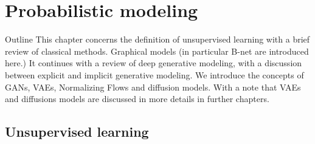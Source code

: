 \chapter{Probabilistic modeling}\label{ch:02}

\begin{remark}{Outline}
This chapter concerns the definition of unsupervised learning with a brief review of classical methods.
Graphical models (in particular B-net are introduced here.)
It continues with a review of deep generative modeling, with a discussion between explicit and implicit generative modeling.
We introduce the concepts of GANs, VAEs, Normalizing Flows and diffusion models. With a note that VAEs and diffusions models
are discussed in more details in further chapters.
\end{remark}

\section{Unsupervised learning}
\label{sec:2:Unsupervised learning}
